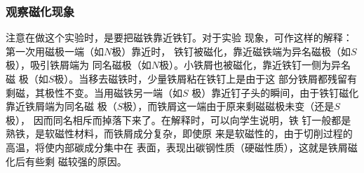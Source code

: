 \subsubsection{观察磁化现象}
注意在做这个实验时，是要把磁铁靠近铁钉。对于实验
现象，可作这样的解释：第一次用磁极一端（如$N$极）靠近时，
铁钉被磁化，靠近磁铁端为异名磁极（如$S$极），吸引铁屑端为
同名磁极（如$N$极）。小铁屑也被磁化，靠近铁钉一侧为异名磁
极（如$S$极）。当移去磁铁时，少量铁屑粘在铁钉上是由于这
部分铁屑都残留有剩磁，其极性不变。当用磁铁另一端（如$S$
极）靠近钉子头的瞬间，由于铁钉磁化靠近铁屑端为同名磁
极（$S$极），而铁屑这一端由于原来剩磁磁极未变（还是$S$极），
因而同名相斥而掉落下来了。在解释时，可以向学生说明，铁
钉一般都是熟铁，是软磁性材料，而铁屑成分复杂，即使原
来是软磁性的，由于切削过程的高温，将使内部碳成分集中在
表面，表现出碳钢性质（硬磁性质），这就是铁屑磁化后有些剩
磁较强的原因。








































